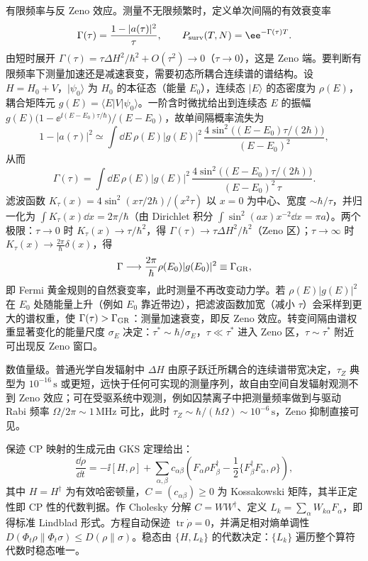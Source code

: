 有限频率与反 Zeno 效应。测量不无限频繁时，定义单次间隔的有效衰变率
\begin{equation}
\Gamma(\tau)=\frac{1-|a(\tau)|^2}{\tau},
\qquad
P_{\rm surv}(T,N)=\ee^{-\Gamma(\tau)T}.
\label{eq:phys-oqs-zeno-effective-rate}
\end{equation}
由短时展开 \(\Gamma(\tau)=\tau\Delta H^2/\hbar^2+O(\tau^2)\to0\)（\(\tau\to0\)），这是 Zeno 端。要判断有限频率下测量加速还是减速衰变，需要初态所耦合连续谱的谱结构。设 \(H=H_0+V\)，\(|\psi_0\rangle\) 为 \(H_0\) 的本征态（能量 \(E_0\)），连续态 \(|E\rangle\) 的态密度为 \(\rho(E)\)，耦合矩阵元 \(g(E)=\langle E|V|\psi_0\rangle\)。一阶含时微扰给出到连续态 \(E\) 的振幅 \(g(E)\bigl(1-\ee^{\ii(E-E_0)\tau/\hbar}\bigr)/(E-E_0)\)，故单间隔概率流失为
\[
1-|a(\tau)|^2
\simeq\int\dd E\,\rho(E)|g(E)|^2\,
\frac{4\sin^2\!\bigl((E-E_0)\tau/(2\hbar)\bigr)}{(E-E_0)^2},
\]
从而
\begin{equation}
\Gamma(\tau)
=\int\dd E\,\rho(E)|g(E)|^2\,
\frac{4\sin^2\!\bigl((E-E_0)\tau/(2\hbar)\bigr)}{(E-E_0)^2\,\tau}.
\label{eq:phys-oqs-zeno-filter}
\end{equation}
滤波函数 \(K_\tau(x)=4\sin^2(x\tau/2\hbar)/(x^2\tau)\) 以 \(x=0\) 为中心、宽度 \(\sim\hbar/\tau\)，并归一化为 \(\int K_\tau(x)\dd x=2\pi/\hbar\)（由 Dirichlet 积分 \(\int\sin^2(ax)x^{-2}\dd x=\pi a\)）。两个极限：\(\tau\to0\) 时 \(K_\tau(x)\to\tau/\hbar^2\)，得 \(\Gamma(\tau)\to\tau\Delta H^2/\hbar^2\)（Zeno 区）；\(\tau\to\infty\) 时 \(K_\tau(x)\to\frac{2\pi}{\hbar}\delta(x)\)，得
\[
\Gamma\longrightarrow\frac{2\pi}{\hbar}\rho(E_0)|g(E_0)|^2\equiv\Gamma_{\rm GR},
\]
即 Fermi 黄金规则的自然衰变率，此时测量不再改变动力学。若 \(\rho(E)|g(E)|^2\) 在 \(E_0\) 处随能量上升（例如 \(E_0\) 靠近带边），把滤波函数加宽（减小 \(\tau\)）会采样到更大的谱权重，使 \(\Gamma(\tau)>\Gamma_{\rm GR}\)：测量加速衰变，即反 Zeno 效应。转变间隔由谱权重显著变化的能量尺度 \(\sigma_E\) 决定：\(\tau^*\sim\hbar/\sigma_E\)，\(\tau\ll\tau^*\) 进入 Zeno 区，\(\tau\sim\tau^*\) 附近可出现反 Zeno 窗口。

数值量级。普通光学自发辐射中 \(\Delta H\) 由原子跃迁所耦合的连续谱带宽决定，\(\tau_Z\) 典型为 \(10^{-16}\,\mathrm{s}\) 或更短，远快于任何可实现的测量序列，故自由空间自发辐射观测不到 Zeno 效应；可在受驱系统中观测，例如囚禁离子中把测量频率做到与驱动 Rabi 频率 \(\Omega/2\pi\sim1\,\mathrm{MHz}\) 可比，此时 \(\tau_Z\sim\hbar/(\hbar\Omega)\sim10^{-6}\,\mathrm{s}\)，Zeno 抑制直接可见。

保迹 CP 映射的生成元由 GKS 定理给出：
\begin{equation}
  \frac{\dd\rho}{\dd t}=-\ii[H,\rho]+\sum_{\alpha,\beta}c_{\alpha\beta}\left(F_\alpha\rho F_\beta^\dagger-\frac{1}{2}\{F_\beta^\dagger F_\alpha,\rho\}\right),
  \label{eq:phys-oqs-gkls}
\end{equation}
其中 \(H=H^\dagger\) 为有效哈密顿量，\(C=(c_{\alpha\beta})\ge0\) 为 Kossakowski 矩阵，其半正定性即 CP 性的代数判据。作 Cholesky 分解 \(C=WW^\dagger\)、定义 \(L_k=\sum_\alpha W_{k\alpha}F_\alpha\)，即得标准 Lindblad 形式。方程自动保迹 \(\operatorname{tr}\dot\rho=0\)，并满足相对熵单调性 \(D(\Phi_t\rho\|\Phi_t\sigma)\le D(\rho\|\sigma)\)。稳态由 \(\{H,L_k\}\) 的代数决定：\(\{L_k\}\) 遍历整个算符代数时稳态唯一。



